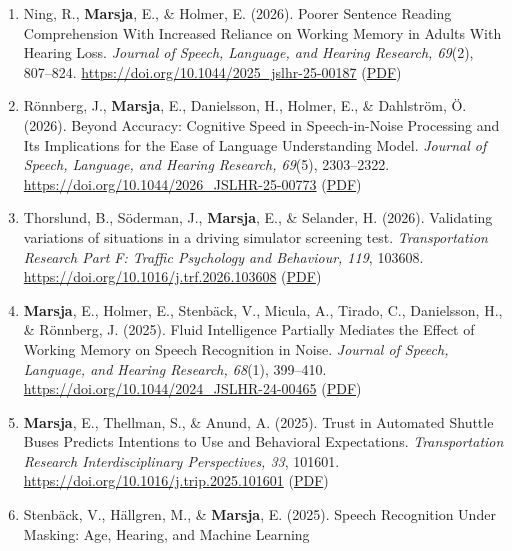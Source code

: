 \documentclass[]{article}
\begin{document}
\begin{enumerate}
{  A Journal of Prevention, Assessment \& Rehabilitation, 84}(1),
  197-209. \url{https://doi.org/10.1177/10519815251398498}
  (\href{https://drive.google.com/file/d/1iE69QlQEUgeearzNIBXDXHiVZqMj0iHj/view?usp=drive_link}{PDF})
\item
  Ning, R., \textbf{Marsja}, E., \& Holmer, E. (2026). Poorer Sentence
  Reading Comprehension With Increased Reliance on Working Memory in
  Adults With Hearing Loss. \emph{Journal of Speech, Language, and
  Hearing Research, 69}(2), 807--824.
  \url{https://doi.org/10.1044/2025_jslhr-25-00187}
  (\href{https://drive.google.com/file/d/1yltitQ_DCWn9ABYErhnbnPrf_zJUc-Mp/view?usp=drive_link}{PDF})
\item
  Rönnberg, J., \textbf{Marsja}, E., Danielsson, H., Holmer, E., \&
  Dahlström, Ö. (2026). Beyond Accuracy: Cognitive Speed in
  Speech-in-Noise Processing and Its Implications for the Ease of
  Language Understanding Model. \emph{Journal of Speech, Language, and
  Hearing Research, 69}(5), 2303--2322.
  \url{https://doi.org/10.1044/2026_JSLHR-25-00773}
  (\href{https://drive.google.com/file/d/1vfpjTRQ7bO8q3RrktHX2Bg9oAf8Vwb6y/view?usp=drive_link}{PDF})
\item
  Thorslund, B., Söderman, J., \textbf{Marsja}, E., \& Selander, H.
  (2026). Validating variations of situations in a driving simulator
  screening test. \emph{Transportation Research Part F: Traffic
  Psychology and Behaviour, 119}, 103608.
  \url{https://doi.org/10.1016/j.trf.2026.103608}
  (\href{https://drive.google.com/file/d/1EZmLled2Htiit2cb-2r4EO9gfKzZW0tV/view?usp=drive_link}{PDF})
\item
  \textbf{Marsja}, E., Holmer, E., Stenbäck, V., Micula, A., Tirado, C.,
  Danielsson, H., \& Rönnberg, J. (2025). Fluid Intelligence Partially
  Mediates the Effect of Working Memory on Speech Recognition in Noise.
  \emph{Journal of Speech, Language, and Hearing Research, 68}(1),
  399--410. \url{https://doi.org/10.1044/2024_JSLHR-24-00465}
  (\href{https://tinyurl.com/gfspin}{PDF})
\item
  \textbf{Marsja}, E., Thellman, S., \& Anund, A. (2025). Trust in
  Automated Shuttle Buses Predicts Intentions to Use and Behavioral
  Expectations. \emph{Transportation Research Interdisciplinary
  Perspectives, 33}, 101601.
  \url{https://doi.org/10.1016/j.trip.2025.101601}
  (\href{https://tinyurl.com/trusttrip}{PDF})
\item
  Stenbäck, V., Hällgren, M., \& \textbf{Marsja}, E. (2025). Speech
  Recognition Under Masking: Age, Hearing, and Machine Learning

\end{enumerate}
\end{document}
